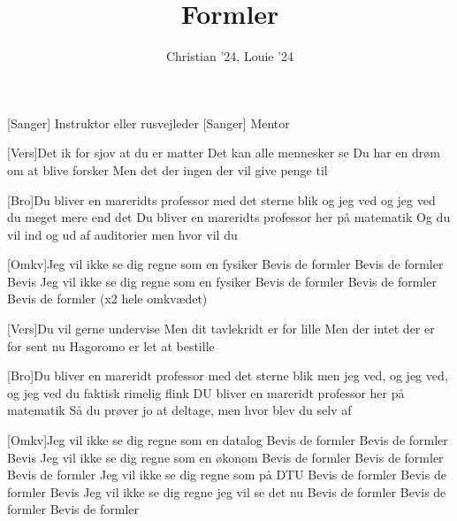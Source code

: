 \documentclass[a4paper,11pt]{article}
\title{Formler}
\author{Christian '24, Louie '24}
\begin{document}
\maketitle

\begin{roles}
[Sanger] Instruktor eller rusvejleder
[Sanger] Mentor

\end{roles}

\begin{song}
    [Vers]Det ik for sjov at du er matter
Det kan alle mennesker se
Du har en drøm om at blive forsker
Men det der ingen der vil give penge til

    [Bro]Du bliver en mareridts professor med det sterne blik
og jeg ved og jeg ved du meget mere end det
 Du bliver en mareridts professor her på matematik
Og du vil ind og ud af auditorier men hvor vil du

    [Omkv]Jeg vil ikke se dig regne som en fysiker
Bevis de formler
Bevis de formler
Bevis
Jeg vil ikke se dig regne som en fysiker
Bevis de formler
Bevis de formler
Bevis de formler (x2 hele omkvædet)

    [Vers]Du vil gerne undervise
Men dit tavlekridt er for lille
Men der intet der er for sent nu
Hagoromo er let at bestille

    [Bro]Du bliver en mareridt professor med det sterne blik
men jeg ved, og jeg ved, og jeg ved du faktisk rimelig flink
DU bliver en mareridt professor her på matematik
Så du prøver jo at deltage, men hvor blev du selv af

    [Omkv]Jeg vil ikke se dig regne som en datalog
Bevis de formler
Bevis de formler
Bevis
Jeg vil ikke se dig regne som en økonom
Bevis de formler
Bevis de formler
Bevis de formler
Jeg vil ikke se dig regne som på DTU
Bevis de formler
Bevis de formler
Bevis
Jeg vil ikke se dig regne jeg vil se det nu
Bevis de formler
Bevis de formler
Bevis de formler
\end{song}
\end{document}
